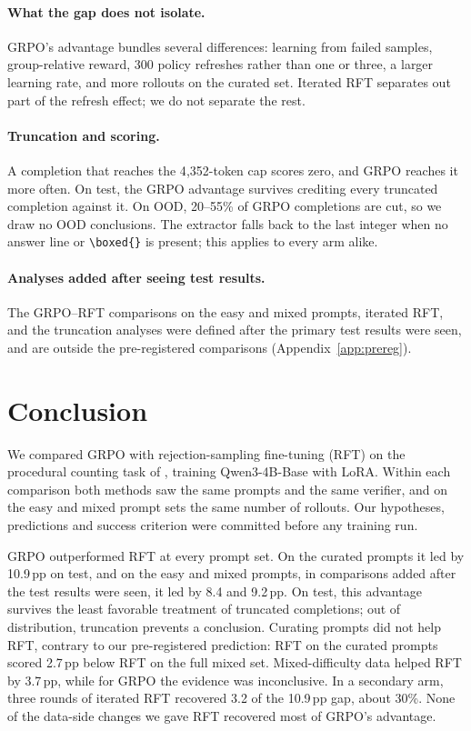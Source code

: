 \documentclass{article}
\begin{document}
\paragraph{What the gap does not isolate.} GRPO's advantage bundles several differences: learning from failed samples, group-relative reward, 300 policy refreshes rather than one or three, a larger learning rate, and more rollouts on the curated set. Iterated RFT separates out part of the refresh effect; we do not separate the rest.

\paragraph{Truncation and scoring.} A completion that reaches the 4{,}352-token cap scores zero, and GRPO reaches it more often. On test, the GRPO advantage survives crediting every truncated completion against it. On OOD, 20--55\% of GRPO completions are
cut, so we draw no OOD conclusions. The extractor falls back to the last integer when no answer line or \verb|\boxed{}| is present; this applies to every arm alike.

\paragraph{Analyses added after seeing test results.} The GRPO--RFT comparisons on the easy and mixed prompts, iterated RFT, and the truncation analyses were defined after the primary test results were seen, and are outside the pre-registered comparisons (Appendix~\ref{app:prereg}).

\section{Conclusion}
\label{sec:conclusion}

We compared GRPO with rejection-sampling fine-tuning (RFT) on the procedural counting task of \citet{bauer2026}, training Qwen3-4B-Base with LoRA. Within each comparison both methods saw the same prompts and the same verifier, and on the easy and mixed prompt sets the same number of rollouts. Our hypotheses, predictions and success criterion were committed before any training run.

GRPO outperformed RFT at every prompt set. On the curated prompts it led by 10.9\,pp on test, and on the easy and mixed prompts, in comparisons added after the test results were seen, it led by 8.4 and 9.2\,pp. On test, this advantage survives the least favorable treatment of truncated completions; out of distribution, truncation prevents a conclusion. Curating prompts did not help RFT, contrary to our pre-registered prediction: RFT on the curated prompts scored 2.7\,pp below RFT on the full mixed set. Mixed-difficulty data helped RFT by 3.7\,pp, while for GRPO the evidence was inconclusive. In a secondary arm, three rounds of iterated RFT recovered 3.2 of the 10.9\,pp gap, about 30\%. None of the data-side changes we gave RFT recovered most of GRPO's advantage.
\end{document}
